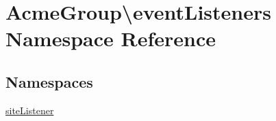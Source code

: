 \hypertarget{namespace_acme_group_1_1event_listeners}{\section{Acme\+Group\textbackslash{}event\+Listeners Namespace Reference}
\label{namespace_acme_group_1_1event_listeners}
}
\subsection*{Namespaces}
\begin{DoxyCompactItemize}
\item 
 \hyperlink{namespace_acme_group_1_1event_listeners_1_1site_listener}{site\+Listener}
\end{DoxyCompactItemize}
